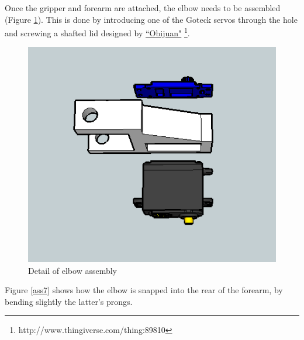 Once the gripper and forearm are attached, the elbow needs to be assembled (Figure \ref{ass5}). This is done by introducing one of the Goteck servos through the hole and screwing a shafted lid designed by  \href{http://www.thingiverse.com/thing:89810}{``Obijuan"} \footnote{http://www.thingiverse.com/thing:89810}.\\






	\begin{figure}[H]
			\centering
			\includegraphics[scale=0.5]{images/Assembly/5.png}
			\caption{Detail of elbow assembly}
			\label{ass5}
	\end{figure}
	\bigskip






Figure \ref{ass7} shows how the elbow is snapped into the rear of the forearm, by bending slightly the latter's prongs.\\

